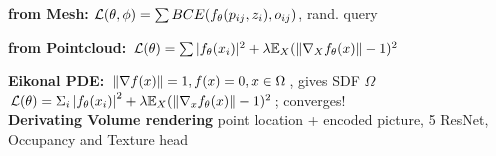 \textbf{from Mesh:} $\mathcal{L}(\theta, \phi) = \sum BCE(f_\theta(p_{ij}, z_i), o_{ij})$, rand. query\\

\textbf{from Pointcloud:} $\mathcal{L}(\theta) = \sum |f_\theta(x_i)|^2 + \lambda \mathbb{E}_X(\left\lVert \nabla_X f_\theta(x) \right\rVert - 1)^2$\\

\textbf{Eikonal PDE:} $\left\lVert \nabla f(x) \right\rVert = 1, f(x) = 0, x \in \Omega$, gives SDF $\Omega$\\
$\mathcal{L}(\theta) = \Sigma_i \left\lvert f_\theta(x_i) \right\rvert^2 + \lambda \mathbb{E}_X(\left\lVert \nabla_x f_\theta(x) \right\rVert - 1)^2$; converges!\\


\textbf{Derivating Volume rendering} point location + encoded picture, 5 ResNet, Occupancy and Texture head\\

